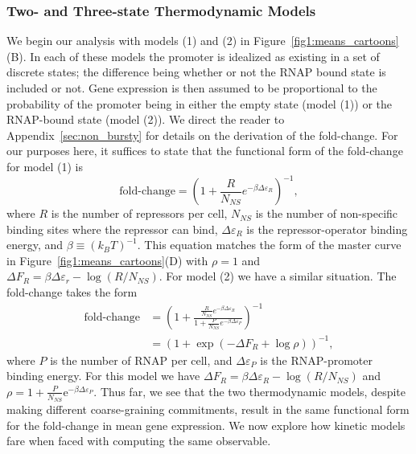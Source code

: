 \subsubsection{Two- and Three-state Thermodynamic Models}
We begin our analysis with models (1) and (2) in
Figure~\ref{fig1:means_cartoons}(B). In each of these models the promoter
is idealized as existing in a set of discrete states; the difference being
whether or not the RNAP bound state is included or not. Gene expression is then
assumed to be proportional to the probability of the promoter being in either
the empty state (model (1)) or the RNAP-bound state (model (2)). We direct the
reader to Appendix~\ref{sec:non_bursty} for details on the derivation of the
fold-change. For our purposes here, it suffices to state that the functional
form of the fold-change for model (1) is
\begin{equation}
\text{fold-change}
= \left(1 + \frac{R}{N_{NS}} e^{-\beta\Delta\varepsilon_R}\right)^{-1},
\end{equation}
where $R$ is the number of repressors per cell, $N_{NS}$ is the number of
non-specific binding sites where the repressor can bind, $\Delta\varepsilon_R$
is the repressor-operator binding energy, and $\beta \equiv (k_BT)^{-1}$. This
equation matches the form of the master curve in
Figure~\ref{fig1:means_cartoons}(D) with $\rho=1$ and $\Delta F_R =
\beta\Delta\varepsilon_r - \log (R / N_{NS})$. For model (2) we have a similar
situation. The fold-change takes the form
\begin{align}
\text{fold-change}
&= \left(
1 + \frac{\frac{R}{N_{NS}} e^{-\beta\Delta\varepsilon_R}}
        {1 + \frac{P}{N_{NS}} e^{-\beta\Delta\varepsilon_P}}
\right)^{-1}
\\
&= (1 + \exp(-\Delta F_R + \log\rho))^{-1},
\end{align}
where $P$ is the number of RNAP per cell, and $\Delta\varepsilon_P$ is the
RNAP-promoter binding energy. For this model we have $\Delta F_R =
\beta\Delta\varepsilon_R - \log(R/N_{NS})$ and $\rho = 1 +
\frac{P}{N_{NS}}\mathrm{e}^{-\beta\Delta\varepsilon_P}$. Thus far, we see that
the two thermodynamic models, despite making different coarse-graining
commitments, result in the same functional form for the fold-change in mean gene
expression.  We now explore how kinetic models fare when faced with computing
the same observable.

